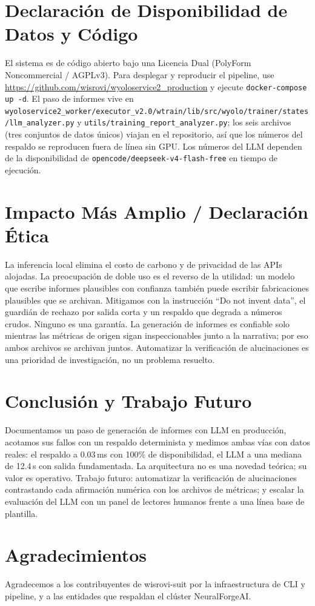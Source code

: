 \documentclass[10pt,twocolumn,letterpaper]{article}
\begin{document}
\section{Declaración de Disponibilidad de Datos y Código}
El sistema es de código abierto bajo una Licencia Dual (PolyForm Noncommercial / AGPLv3). Para desplegar y reproducir el pipeline, use \url{https://github.com/wisrovi/wyoloservice2_production} y ejecute \texttt{docker-compose up -d}. El paso de informes vive en \texttt{wyoloservice2\_worker/executor\_v2.0/wtrain/lib/src/wyolo/trainer/states/llm\_analyzer.py} y \texttt{utils/training\_report\_analyzer.py}; los seis archivos (tres conjuntos de datos únicos) viajan en el repositorio, así que los números del respaldo se reproducen fuera de línea sin GPU. Los números del LLM dependen de la disponibilidad de \texttt{opencode/deepseek-v4-flash-free} en tiempo de ejecución.

\section{Impacto Más Amplio / Declaración Ética}
La inferencia local elimina el costo de carbono y de privacidad de las APIs alojadas. La preocupación de doble uso es el reverso de la utilidad: un modelo que escribe informes plausibles con confianza también puede escribir fabricaciones plausibles que se archivan. Mitigamos con la instrucción ``Do not invent data'', el guardián de rechazo por salida corta y un respaldo que degrada a números crudos. Ninguno es una garantía. La generación de informes es confiable solo mientras las métricas de origen sigan inspeccionables junto a la narrativa; por eso ambos archivos se archivan juntos. Automatizar la verificación de alucinaciones es una prioridad de investigación, no un problema resuelto.

\section{Conclusión y Trabajo Futuro}
Documentamos un paso de generación de informes con LLM en producción, acotamos sus fallos con un respaldo determinista y medimos ambas vías con datos reales: el respaldo a 0.03\,ms con 100\% de disponibilidad, el LLM a una mediana de 12.4\,s con salida fundamentada. La arquitectura no es una novedad teórica; su valor es operativo. Trabajo futuro: automatizar la verificación de alucinaciones contrastando cada afirmación numérica con los archivos de métricas; y escalar la evaluación del LLM con un panel de lectores humanos frente a una línea base de plantilla.

\section{Agradecimientos}
Agradecemos a los contribuyentes de wisrovi-suit por la infraestructura de CLI y pipeline, y a las entidades que respaldan el clúster NeuralForgeAI.



\end{document}
